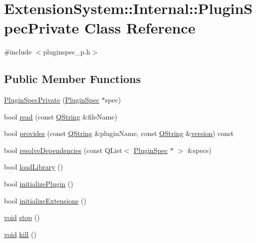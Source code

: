 \hypertarget{class_extension_system_1_1_internal_1_1_plugin_spec_private}{\section{\-Extension\-System\-:\-:\-Internal\-:\-:\-Plugin\-Spec\-Private \-Class \-Reference}
\label{class_extension_system_1_1_internal_1_1_plugin_spec_private}
}


{\ttfamily \#include $<$pluginspec\-\_\-p.\-h$>$}

\subsection*{\-Public \-Member \-Functions}
\begin{DoxyCompactItemize}
\item 
\hyperlink{class_extension_system_1_1_internal_1_1_plugin_spec_private_a0d44c8c936a8c62f5ad88ff19c70b9aa}{\-Plugin\-Spec\-Private} (\hyperlink{class_extension_system_1_1_plugin_spec}{\-Plugin\-Spec} $\ast$spec)
\item 
bool \hyperlink{class_extension_system_1_1_internal_1_1_plugin_spec_private_ab17f9aacac39aa19b98897bc6faafcd0}{read} (const \hyperlink{group___u_a_v_objects_plugin_gab9d252f49c333c94a72f97ce3105a32d}{\-Q\-String} \&file\-Name)
\item 
bool \hyperlink{class_extension_system_1_1_internal_1_1_plugin_spec_private_aafdcb363fa1e2f8af75c77b13d16f7c1}{provides} (const \hyperlink{group___u_a_v_objects_plugin_gab9d252f49c333c94a72f97ce3105a32d}{\-Q\-String} \&plugin\-Name, const \hyperlink{group___u_a_v_objects_plugin_gab9d252f49c333c94a72f97ce3105a32d}{\-Q\-String} \&\hyperlink{class_extension_system_1_1_internal_1_1_plugin_spec_private_a00cf7a310301d427a56b1b23576289bc}{version}) const 
\item 
bool \hyperlink{class_extension_system_1_1_internal_1_1_plugin_spec_private_a85aa6e98c8148c4d88b70118dc271f03}{resolve\-Dependencies} (const \-Q\-List$<$ \hyperlink{class_extension_system_1_1_plugin_spec}{\-Plugin\-Spec} $\ast$ $>$ \&specs)
\item 
bool \hyperlink{class_extension_system_1_1_internal_1_1_plugin_spec_private_ae6c8e468abd33bfa0d2f3cc04afa14c9}{load\-Library} ()
\item 
bool \hyperlink{class_extension_system_1_1_internal_1_1_plugin_spec_private_a3bf586c7c6de7d0e8cbffc91a9895b25}{initialize\-Plugin} ()
\item 
bool \hyperlink{class_extension_system_1_1_internal_1_1_plugin_spec_private_ae5901e2eca5aa40d0c0525b40de51ccd}{initialize\-Extensions} ()
\item 
\hyperlink{group___u_a_v_objects_plugin_ga444cf2ff3f0ecbe028adce838d373f5c}{void} \hyperlink{class_extension_system_1_1_internal_1_1_plugin_spec_private_a19705e05760dcdf3dc55ace4e2e95f45}{stop} ()
\item 
\hyperlink{group___u_a_v_objects_plugin_ga444cf2ff3f0ecbe028adce838d373f5c}{void} \hyperlink{class_extension_system_1_1_internal_1_1_plugin_spec_private_a7581a0cfec32239b633b4689542a56db}{kill} ()
\end{DoxyCompactItemize}
